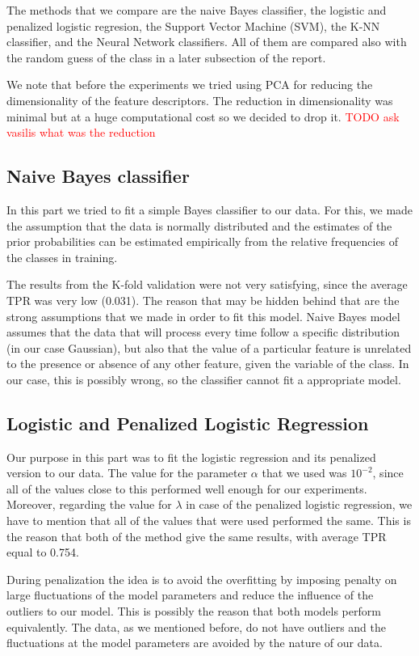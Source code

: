 \noindent The methods that we compare are the naive Bayes classifier, the logistic and penalized logistic regresion, the Support Vector Machine (SVM), the K-NN classifier, and the Neural Network classifiers. All of them are compared also with the random guess of the class in a later subsection of the report.

\noindent We note that before the experiments we tried using PCA for reducing the dimensionality of the feature descriptors. The reduction in dimensionality was minimal but at a huge computational cost so we decided to drop it.
\textcolor{red}{TODO ask vasilis what was the reduction}

\subsection{Naive Bayes classifier}
\noindent In this part we tried to fit a simple Bayes classifier to our data. For this, we made the assumption that the data is normally distributed and the estimates of the prior probabilities can be estimated empirically from the relative frequencies of the classes in training.

\noindent The results from the K-fold validation were not very satisfying, since the average TPR was very low (0.031). The reason that may be hidden behind that are the strong assumptions that we made in order to fit this model. Naive Bayes model assumes that the data that will process every time follow a specific distribution (in our case Gaussian), but also that the value of a particular feature is unrelated to the presence or absence of any other feature, given the variable of the class. In our case, this is possibly wrong, so the classifier cannot fit a appropriate model.

\subsection{Logistic and Penalized Logistic Regression}
\noindent Our purpose in this part was to fit the logistic regression and its penalized version to our data. The value for the parameter $\alpha$ that we used was $10^{-2}$, since all of the values close to this performed well enough for our experiments. Moreover, regarding the value for $\lambda$ in case of the penalized logistic regression, we have to mention that all of the values that were used performed the same. This is the reason that both of the method give the same results, with average TPR equal to 0.754.

\noindent During penalization the idea is to avoid the overfitting by imposing penalty on large fluctuations of the model parameters and reduce the influence of the outliers to our model. This is possibly the reason that both models perform equivalently. The data, as we mentioned before, do not have outliers and the fluctuations at the model parameters are avoided by the nature of our data.

